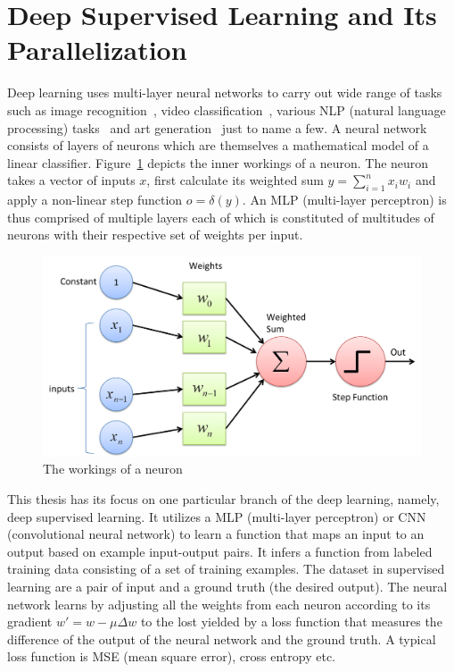 \section{Deep Supervised Learning and Its Parallelization}
\label{sec:dnn}
Deep learning uses multi-layer neural networks to carry out wide range of tasks 
such as image recognition~\cite{alexnet},  video 
classification~\cite{video_class}, various NLP (natural language processing) 
tasks~\cite{nlp0, nlp1, nlp2, nlp3} and art generation~\cite{gan, can} just to 
name a few. A neural network consists of layers of neurons which are themselves 
a mathematical model of a linear classifier. Figure~\ref{fig:perceptron} depicts 
the inner workings of a neuron. The neuron takes a vector of inputs $x$, first 
calculate its weighted sum $y = \sum_{i=1}^{n} x_i w_i$ and apply a non-linear 
step function $o = \delta(y)$. An MLP (multi-layer perceptron) is thus comprised 
of multiple layers each of which is constituted of multitudes of neurons with 
their respective set of weights per input.
\begin{figure}[H]
    \centerline{\includegraphics[scale=0.25]{background/figs/perceptron.png}}
    \caption{The workings of a neuron}
    \label{fig:perceptron}
\end{figure}

This thesis has its focus on one particular branch of the deep learning, namely, 
deep supervised learning. It utilizes a MLP (multi-layer perceptron) or CNN 
(convolutional neural network) to learn a function that maps an input to an 
output based on example input-output pairs. It infers a function from labeled 
training data consisting of a set of training examples. The dataset in 
supervised learning are a pair of input and a ground truth (the desired output).
The neural network learns by adjusting all the weights from each neuron 
according to its gradient $w' = w - \mu \Delta w$ to the lost yielded by a loss 
function that measures the difference of the output of the neural network and 
the ground truth. A typical loss function is MSE (mean square error), cross 
entropy etc.

